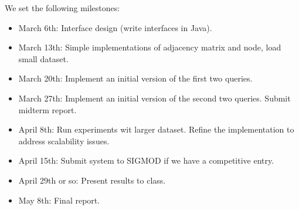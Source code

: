 \documentclass{article}
\begin{document}
\newpage

We set the following milestones:

\begin{itemize}
\item March 6th: Interface design (write interfaces in Java).
\item March 13th: Simple implementations of adjacency matrix and node, load small dataset.
\item March 20th: Implement an initial version of the first two queries.
\item March 27th: Implement an initial version of the second two queries. Submit midterm report.
\item April 8th: Run experiments wit larger dataset. Refine the implementation to address scalability issues.
\item April 15th: Submit system to SIGMOD if we have a competitive entry.
\item April 29th or so: Present results to class.
\item May 8th: Final report.
\end{itemize}



\end{document}
